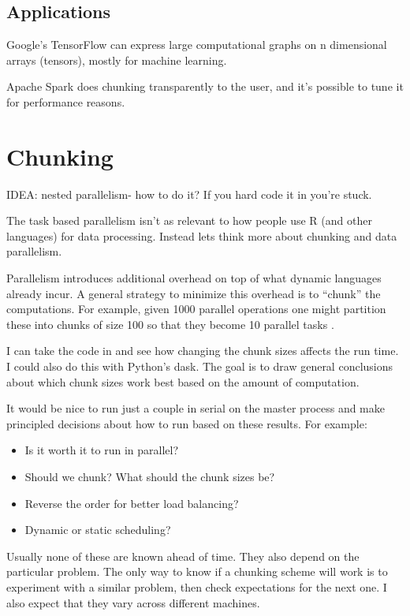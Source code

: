\documentclass[12pt]{article}
\begin{document}
\subsection{Applications}

Google's TensorFlow can express large computational graphs on n dimensional
arrays (tensors), mostly for machine learning.

Apache Spark does chunking transparently to the user, and it's possible to
tune it for performance reasons.


\section{Chunking}

IDEA: nested parallelism- how to do it? If you hard code it in you're
stuck.

The task based parallelism isn't as relevant to how people use R (and other
languages) for data processing. Instead
lets think more about chunking and data parallelism. 

Parallelism introduces additional overhead on top of what dynamic languages
already incur. A general strategy to minimize this overhead is to ``chunk''
the computations. For example, given 1000 parallel operations one might
partition these into chunks of size 100 so that they become 10 parallel
tasks \cite{matloff2015parallel}.

I can take the code in \cite{matloff2015parallel} and see how changing the
chunk sizes affects the run time. I could also do this with Python's dask.
The goal is to draw general conclusions about which chunk sizes work best
based on the amount of computation.

It would be nice to run just a couple in serial on the master process and
make principled decisions about how to run based on these results. For
example:
\begin{itemize}
    \item Is it worth it to run in parallel?
    \item Should we chunk? What should the chunk sizes be?
    \item Reverse the order for better load balancing?
    \item Dynamic or static scheduling?
\end{itemize}

Usually none of these are known ahead of time.  They also depend on the
particular problem.  The only way to know if a chunking scheme will work is
to experiment with a similar problem, then check expectations for the next
one. I also expect that they vary across different machines.
\end{document}
